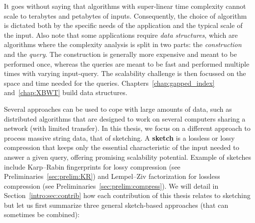 %
It goes without saying that algorithms with super-linear time complexity cannot scale to terabytes and petabytes of inputs. Consequently, the choice of algorithm is dictated both by the specific needs of the application and the typical scale of the input.
%
Also note that some applications require \emph{data structures}, which are algorithms where the complexity analysis is split in two parts: the \emph{construction} and the \emph{query}. The construction is generally more expensive and meant to be performed once, whereas the queries are meant to be fast and performed multiple times with varying input-query. The scalability challenge is then focussed on the space and time needed for the queries. Chapters~\ref{chap:gapped_index} and~\ref{chap:XBWT} build data structures.

Several approaches can be used to cope with large amounts of data, such as distributed algorithms that are designed to work on several computers sharing a network (with limited transfer). In this thesis, we focus on a different approach to process massive string data, that of sketching. A \textbf{sketch} is a lossless or lossy compression that keeps only the essential characteristic of the input needed to answer a given query, offering promising scalability potential. Example of sketches include Karp--Rabin fingerprints for lossy compression (see Preliminaries~\ref{sec:prelim:KR}) and Lempel--Ziv factorization for lossless compression (see Preliminaries~\ref{sec:prelim:compress}). 
We will detail in Section~\ref{intro:sec:contrib} how each contribution of this thesis relates to sketching but let us first summarize three general sketch-based approaches (that can sometimes be combined):

